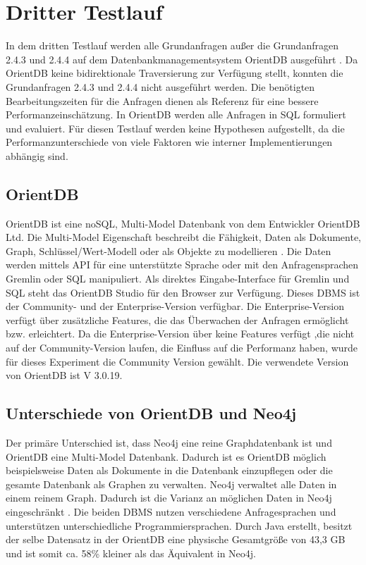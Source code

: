 \section{Dritter Testlauf}
In dem dritten Testlauf werden alle Grundanfragen außer die Grundanfragen 2.4.3 und 2.4.4 auf dem Datenbankmanagementsystem OrientDB ausgeführt \parencite{OrientDB}. Da OrientDB keine bidirektionale Traversierung zur Verfügung stellt, konnten die Grundanfragen 2.4.3 und 2.4.4 nicht ausgeführt werden. Die benötigten Bearbeitungszeiten für die Anfragen dienen als Referenz für eine bessere Performanzeinschätzung. In OrientDB werden alle Anfragen in SQL formuliert und evaluiert. Für diesen Testlauf werden keine Hypothesen aufgestellt, da die Performanzunterschiede von viele Faktoren wie interner Implementierungen abhängig sind. 
\subsection{OrientDB}
OrientDB ist eine noSQL,  Multi-Model Datenbank von dem Entwickler OrientDB Ltd. Die Multi-Model Eigenschaft beschreibt die Fähigkeit, Daten als Dokumente, Graph, Schlüssel/Wert-Modell oder als Objekte zu modellieren \parencite{OrientDB}. Die Daten werden mittels API für eine unterstützte Sprache oder mit den Anfragensprachen Gremlin oder SQL manipuliert. Als direktes Eingabe-Interface für Gremlin und SQL steht das OrientDB Studio für den Browser zur Verfügung.  Dieses DBMS ist der Community- und der Enterprise-Version verfügbar. Die Enterprise-Version verfügt über zusätzliche Features, die das Überwachen der Anfragen ermöglicht bzw. erleichtert. Da die Enterprise-Version über keine Features verfügt ,die nicht auf der Community-Version laufen, die Einfluss auf die  Performanz haben, wurde für dieses Experiment die Community Version gewählt. Die verwendete Version von OrientDB ist V 3.0.19. 
\subsection{Unterschiede von OrientDB und Neo4j}
Der primäre Unterschied ist, dass Neo4j eine reine Graphdatenbank ist und OrientDB eine Multi-Model Datenbank. Dadurch ist es OrientDB möglich beispielsweise Daten als Dokumente in die Datenbank einzupflegen oder die gesamte Datenbank als Graphen zu verwalten. Neo4j verwaltet alle Daten in einem reinem Graph. Dadurch ist  die Varianz an möglichen Daten in Neo4j eingeschränkt \parencite{fernandes2018graph}. Die beiden DBMS nutzen verschiedene Anfragesprachen und unterstützen unterschiedliche Programmiersprachen. Durch Java erstellt, besitzt der selbe Datensatz in der OrientDB eine physische Gesamtgröße von 43,3 GB und ist somit ca. 58\% kleiner als das Äquivalent in Neo4j.